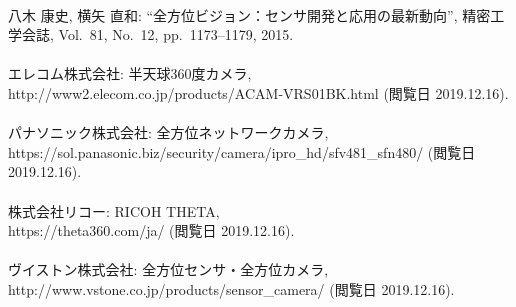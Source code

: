 \begin{mythebibliography}{}

\leavevmode \\八木 康史, 横矢 直和:
\newblock ``全方位ビジョン：センサ開発と応用の最新動向'',
\newblock 精密工学会誌, Vol.~81, No.~12, pp.~1173--1179, 2015.
\\

\leavevmode \\エレコム株式会社:
\newblock 半天球360度カメラ,\\
\newblock http://www2.elecom.co.jp/products/ACAM-VRS01BK.html (閲覧日 2019.12.16).
\\

\leavevmode \\パナソニック株式会社:
\newblock 全方位ネットワークカメラ,\\
\newblock https://sol.panasonic.biz/security/camera/ipro\_hd/sfv481\_sfn480/ (閲覧日 2019.12.16).
\\

\leavevmode \\株式会社リコー:
\newblock RICOH THETA,\\
\newblock https://theta360.com/ja/ (閲覧日 2019.12.16).
\\

\leavevmode \\ヴイストン株式会社:
\newblock 全方位センサ・全方位カメラ,\\
\newblock http://www.vstone.co.jp/products/sensor\_camera/ (閲覧日 2019.12.16).
\\




\newpage
\subsection*{}


\end{mythebibliography}

